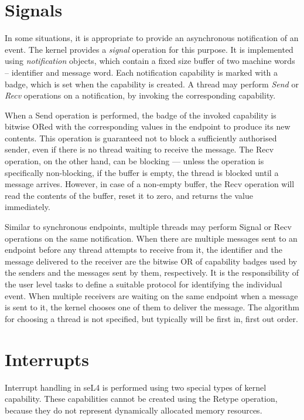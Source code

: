 \section{Signals}\label{sec:overview.signals}

In some situations, it is appropriate to provide an asynchronous notification
of an event. The kernel provides a \emph{signal} operation for this
purpose. It is implemented using \emph{notification} objects, which
contain a fixed size buffer of two machine words -- identifier and message word. 
Each notification capability is marked with a badge, which is set when
the capability is created. A thread may perform \emph{Send} or \emph{Recv}
operations on a notification, by invoking the corresponding
capability. 

When a Send operation is performed, the badge of the invoked capability is bitwise ORed with the corresponding values in the
endpoint to produce its new contents. This operation is guaranteed not to block
a sufficiently authorised sender, even if there is no thread waiting to receive
the message. The Recv operation, on the other hand, can be blocking --- unless the operation is specifically non-blocking, if the
buffer is empty, the thread is blocked until a message arrives. However, in
case of a non-empty buffer, the Recv operation will read the contents of the
buffer, reset it to zero, and returns the value immediately. 

Similar to synchronous endpoints, multiple threads may perform Signal or Recv
operations on the same notification. When there are multiple messages
sent to an endpoint before any thread attempts to receive from it, the
identifier and the message delivered to the receiver are the bitwise OR of
capability badges used by the senders and the messages sent by them,
respectively. It is the responsibility of the user level tasks to define a
suitable protocol for identifying the individual event. When multiple receivers
are waiting on the same endpoint when a message is sent to it, the kernel
chooses one of them to deliver the message. The algorithm for choosing a thread
is not specified, but typically will be first in, first out order.

\section{Interrupts}\label{sec:overview.interrupts}

Interrupt handling in seL4 is performed using two special types of kernel 
capability. These capabilities cannot be created using the Retype operation,
because they do not represent dynamically allocated memory resources.

